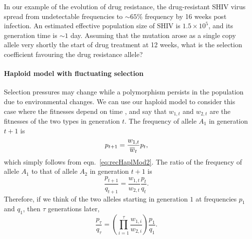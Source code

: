 \begin{question}
In our example of the evolution of drug resistance, the drug-resistant SHIV virus spread from undetectable frequencies to $\sim 65\%$ frequency by 16 weeks post infection. An estimated effective population size of SHIV is $1.5 \times 10^5$, and its generation time is $\sim 1$ day. Assuming that the mutation arose as a single copy allele very shortly the start of drug treatment at 12 weeks, what is the selection coefficient favouring the drug resistance allele?  
\end{question}





\paragraph{Haploid model with fluctuating selection}
Selection pressures may change while a polymorphism persists in the population due to environmental changes. 
We can use our haploid model to consider this case where the fitnesses depend on time \citep{Dempster:55}, and
say that $w_{1,t}$ and $w_{2,t}$ are the fitnesses of the two types in
generation $t$. The frequency of allele $A_1$ in generation $t+1$ is
\begin{equation}
p_{t+1} = \frac{w_{1,t}}{\overline{w}_t} p_t,
\end{equation}
which simply follows from eqn.\ \eqref{eq:recHaplMod2}.
The ratio of the frequency of allele $A_1$ to that of allele $A_2$ in generation $t+1$ is
\begin{equation}
\frac{p_{t+1}}{q_{t+1}} = \frac{w_{1,t}}{w_{2,t}}  \frac{p_{t}}{q_{t}}.
\end{equation}
Therefore, if we think of the two alleles starting in generation $1$ at
frequencies $p_1$ and $q_1$, then $\tau$ generations later,
\begin{equation}
\frac{p_{\tau}}{q_{\tau}} = \left(\prod_{i=1}^{\tau} \frac{w_{1,i}}{w_{2,i}}  \right) \frac{p_{1}}{q_{1}}.
\end{equation}
\\

